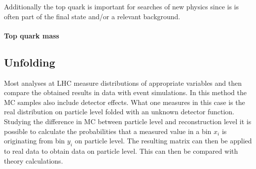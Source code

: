	Additionally the top quark is important for searches of new physics since is is often part of the final state and/or a relevant background.
\paragraph{Top quark mass}
\subsection{Unfolding}
	Most analyses at LHC measure distributions of appropriate variables and then compare the obtained results in data with event simulations. In this method the MC samples also include detector effects. What one measures in this case is the real distribution on particle level folded with an unknown detector function. Studying the difference in MC between particle level and reconstruction level it is possible to calculate the probabilities that a measured value in a bin $x_i$ is originating from bin $y_i$ on particle level. The resulting matrix can then be applied to real data to obtain data on particle level. This can then be compared with theory calculations.
	